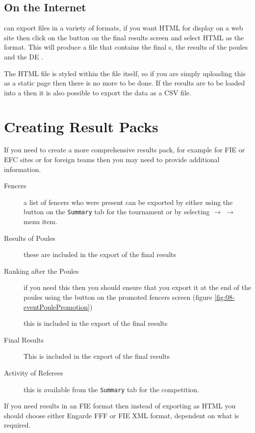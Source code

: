 \documentclass[a4paper,11pt]{memoir}
\begin{document}
\subsection{On the Internet}

\fencingtime{} can export files in a variety of formats, if you want HTML for display on a web site then click on the  button on the final results screen and select HTML as the format. This will produce a file that contains the final s, the results of the poules and the DE . 

The HTML file is styled within the file itself, so if you are simply uploading this as a static page then there is no more to be done. 
If the results are to be loaded into a  then it is also possible to export the data as a CSV file.

\section{Creating Result Packs}

If you need to create a more comprehensive results pack, for example for FIE or EFC sites or for foreign teams then you may need to provide additional information. 

\begin{description}
 \item[Fencers] a list of fencers who were present can be exported by either using the  button on the \texttt{Summary} tab for the tournament or by selecting  $\rightarrow$  $\rightarrow$  menu item.
 \item[Results of Poules] these are included in the export of the final results
 \item[Ranking after the Poules] if you need this then you should ensure that you export it at the end of the poules using the  button on the promoted fencers screen (figure \ref{fig:08-eventPoulePromotion})
 \item[] this is included in the export of the final results
 \item[Final Results] This is included in the export of the final results
 \item[Activity of Referees] this is available from the \texttt{Summary} tab for the competition.
\end{description}

If you need results in an FIE format then instead of exporting as HTML you should choose either Engarde FFF or FIE XML format, dependent on what is required.
\end{document}
